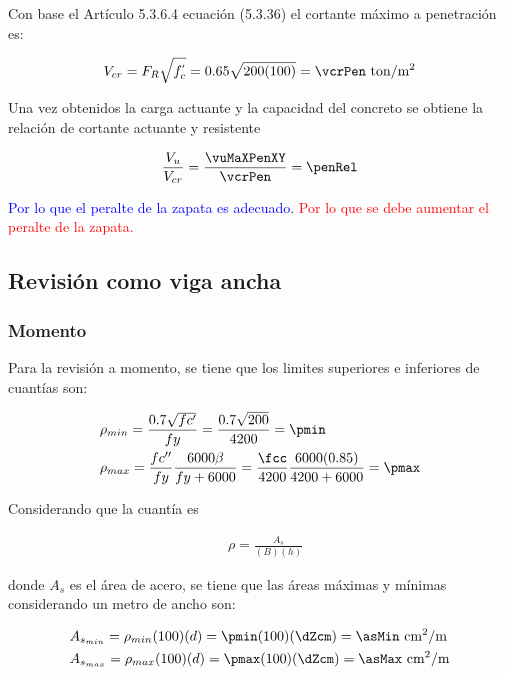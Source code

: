 \documentclass[11pt,a4paper,fleqn]{article}
\begin{document}
Con base el Artículo 5.3.6.4 ecuación (5.3.36) el cortante máximo a penetración es:



\begin{align*}
		V_{cr}=F_R\sqrt{f^{'}_{c}}=0.65\sqrt{\fc(100)}=\vcrPen \text{ ton/m$^2$}
\end{align*}

Una vez obtenidos la carga actuante y la capacidad del concreto se obtiene la relación de cortante actuante y resistente

\begin{align*}
		\frac{V_u}{V_{cr}}=\frac{\vuMaXPenXY}{\vcrPen}=\penRel
\end{align*}

 \penRel  \textcolor{blue}{Por lo que  el peralte de la zapata es adecuado}. \else \textcolor{red}{Por lo que se debe aumentar el peralte de la zapata.} \fi


\subsection{Revisión como viga ancha}
\subsubsection{Momento}
Para la revisión a momento, se tiene que los limites superiores e inferiores de cuantías son:


\begin{align*}
	&\rho_{min}=\frac{0.7\sqrt{fc'}}{fy}                   =\frac{0.7\sqrt{\fc}}{\fy}                     =\pmin\\
	&\rho_{max}=\frac{fc''}{fy}\frac{6000\beta}{fy+6000}   =\frac{\fcc}{\fy}\frac{6000(0.85)}{\fy+6000}   =\pmax
\end {align*}

Considerando que la cuantía es

\begin{align*}
	&\rho=\frac{A_s}{(B)(h)}
\end {align*}

donde $A_s$ es el área de acero, se tiene que las áreas máximas y mínimas considerando un metro de ancho son:

\begin{align*}
	&A_{s_{min}}=\rho_{min}(100)(d)=\pmin(100)(\dZcm)= \asMin \text{ cm$^2$/m} \\
	&A_{s_{max}}=\rho_{max}(100)(d)=\pmax(100)(\dZcm)= \asMax \text{ cm$^2$/m}
\end{align*}
\end{document}
